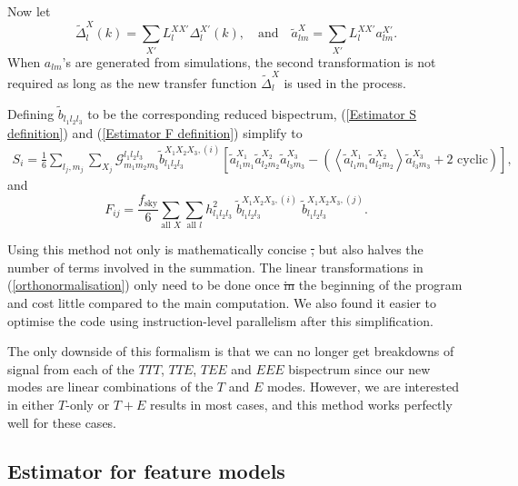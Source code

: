 \documentclass[a4paper,12pt,times,custombib,print,index]{Classes/PhDThesisPSnPDF} %
\providecommand{\DIFadd}[1]{{\protect\color{blue}\uwave{#1}}} %
\providecommand{\DIFdel}[1]{{\protect\color{red}\sout{#1}}}                      %
\providecommand{\DIFaddbegin}{} %
\providecommand{\DIFaddend}{} %
\providecommand{\DIFdelbegin}{} %
\providecommand{\DIFdelend}{} %
\newcommand{\DIFscaledelfig}{0.5}
\newlength{\DIFdelgraphicswidth} %
\newlength{\DIFdelgraphicsheight} %
\newcommand{\DIFaddincludegraphics}[2][]{{\color{blue}\fbox{\DIFOincludegraphics[#1]{#2}}}} %
\newcommand{\DIFdelincludegraphics}[2][]{%
\sbox{\DIFdelgraphicsbox}{\DIFOincludegraphics[#1]{#2}}%
\settoboxwidth{\DIFdelgraphicswidth}{\DIFdelgraphicsbox} %
\settoboxtotalheight{\DIFdelgraphicsheight}{\DIFdelgraphicsbox} %
\scalebox{\DIFscaledelfig}{%
\parbox[b]{\DIFdelgraphicswidth}{\usebox{\DIFdelgraphicsbox}\\[-\baselineskip] \rule{\DIFdelgraphicswidth}{0em}}\llap{\resizebox{\DIFdelgraphicswidth}{\DIFdelgraphicsheight}{%
\setlength{\unitlength}{\DIFdelgraphicswidth}%
\begin{picture}(1,1)%
\thicklines\linethickness{2pt} %
{\color[rgb]{1,0,0}\put(0,0){\framebox(1,1){}}}%
{\color[rgb]{1,0,0}\put(0,0){\line( 1,1){1}}}%
{\color[rgb]{1,0,0}\put(0,1){\line(1,-1){1}}}%
\end{picture}%
}\hspace*{3pt}}} %
} %
\DeclareRobustCommand{\DIFaddbegin}{\DIFOaddbegin \let\includegraphics\DIFaddincludegraphics} %
\DeclareRobustCommand{\DIFaddend}{\DIFOaddend \let\includegraphics\DIFOincludegraphics} %
\DeclareRobustCommand{\DIFdelbegin}{\DIFOdelbegin \let\includegraphics\DIFdelincludegraphics} %
\DeclareRobustCommand{\DIFdelend}{\DIFOaddend \let\includegraphics\DIFOincludegraphics} %
\begin{document}
\DIFaddend Now let
\begin{equation}
	\tilde{\Delta}_{l}^X (k) = \sum_{X'} L_l^{XX'} \Delta_{l}^{X'} (k), \quad\text{and}\quad \tilde{a}_{lm}^X = \sum_{X'} L_l^{XX'} a_{lm}^{X'}.
	\label{orthonormalisation}
\end{equation}
When $a_{lm}$'s are generated from simulations, the second transformation is not required as long as the new transfer function $\tilde{\Delta}_l^X$ is used in the process.

Defining $\tilde{b}_{l_1 l_2 l_3}$ to be the corresponding reduced bispectrum, (\ref{Estimator S definition}) and (\ref{Estimator F definition}) simplify to
\begin{eqnarray}
	S_i =  \frac{1}{6} \sum_{l_j, m_j} \sum_{X_j} \mathcal{G}_{m_1 m_2 m_3}^{l_1 l_2 l_3} \tilde{b}_{l_1 l_2 l_3} ^{X_1 X_2 X_3, (i)} \left[ \tilde{a}_{l_1 m_1}^{X_1} \tilde{a}_{l_2 m_2}^{X_2} \tilde{a}_{l_3 m_3}^{X_3} -  \left( \left< \tilde{a}_{l_1 m_1}^{X_1} \tilde{a}_{l_2 m_2}^{X_2} \right> \tilde{a}_{l_3 m_3}^{X_3} + \text{2 cyclic} \right)   \right],
	\label{KSW estimator S after orthonormalisation}
\end{eqnarray}
and
\begin{equation}
	F_{ij}= \frac{f_\text{sky}}{6} \sum_{\text{all }X} \sum_{\text{all }l} h_{l_1 l_2 l_3}^2 \; \tilde{b}_{l_1 l_2 l_3}^{X_1 X_2 X_3, (i)} \; \tilde{b}_{l_1 l_2 l_3}^{X_1 X_2 X_3, (j)}.
	\label{KSW estimator F after orthonormalisation}
\end{equation}

Using this method not only is mathematically concise \DIFdelbegin \DIFdel{, }\DIFdelend but also halves the number of terms involved in the summation. The linear transformations in (\ref{orthonormalisation}) only need to be done once \DIFdelbegin \DIFdel{in }\DIFdelend \DIFaddbegin \DIFadd{at }\DIFaddend the beginning of the program and cost little compared to the main computation. We also found it easier to optimise the code using instruction-level parallelism after this simplification.

The only downside of this formalism is that we can no longer get breakdowns of signal from each of the $TTT$, $TTE$, $TEE$ and $EEE$ bispectrum since our new modes are linear combinations of the $T$ and $E$ modes. However, we are interested in either $T$-only or $T+E$ results in most cases, and this method works perfectly well for these cases.

\subsection{Estimator for feature models}
\end{document}
